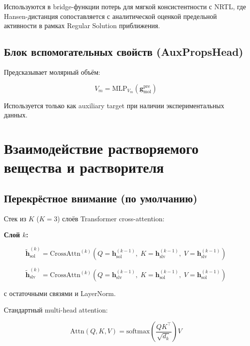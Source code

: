 \documentclass[11pt]{article}
\begin{document}
Используются в bridge-функции потерь для мягкой консистентности с NRTL, где Hansen-дистанция сопоставляется с аналитической оценкой предельной активности в рамках Regular Solution приближения.

\subsection{Блок вспомогательных свойств (AuxPropsHead)}

Предсказывает молярный объём:

\begin{equation*}
V_m = \mathrm{MLP}_{V_m}(\mathbf{g}_{\mathrm{mol}}^{\mathrm{pre}})
\end{equation*}

Используется только как auxiliary target при наличии экспериментальных данных.

\section{Взаимодействие растворяемого вещества и растворителя}
\label{sec:interaction-block}

\subsection{Перекрёстное внимание (по умолчанию)}

Стек из $K$ ($K = 3$) слоёв Transformer cross-attention:

\textbf{Слой $k$:}

\begin{equation*}
\tilde{\mathbf{h}}_{\mathrm{sol}}^{(k)} = \mathrm{CrossAttn}^{(k)}\!\left(Q = \mathbf{h}_{\mathrm{sol}}^{(k-1)},\; K = \mathbf{h}_{\mathrm{slv}}^{(k-1)},\; V = \mathbf{h}_{\mathrm{slv}}^{(k-1)}\right)
\end{equation*}

\begin{equation*}
\tilde{\mathbf{h}}_{\mathrm{slv}}^{(k)} = \mathrm{CrossAttn}^{(k)}\!\left(Q = \mathbf{h}_{\mathrm{slv}}^{(k-1)},\; K = \mathbf{h}_{\mathrm{sol}}^{(k-1)},\; V = \mathbf{h}_{\mathrm{sol}}^{(k-1)}\right)
\end{equation*}

с остаточными связями и LayerNorm.

Стандартный multi-head attention:

\begin{equation*}
\mathrm{Attn}(Q, K, V) = \mathrm{softmax}\!\left(\frac{QK^\top}{\sqrt{d_k}}\right) V
\end{equation*}
\end{document}
